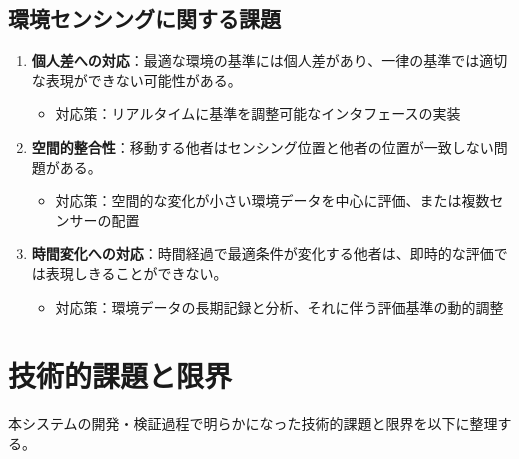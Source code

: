 \documentclass{cuxarticle}
\begin{document}
\subsection{環境センシングに関する課題}
\begin{enumerate}
  \item \textbf{個人差への対応}：最適な環境の基準には個人差があり、一律の基準では適切な表現ができない可能性がある。
    \begin{itemize}
      \item 対応策：リアルタイムに基準を調整可能なインタフェースの実装
    \end{itemize}

  \item \textbf{空間的整合性}：移動する他者はセンシング位置と他者の位置が一致しない問題がある。
    \begin{itemize}
      \item 対応策：空間的な変化が小さい環境データを中心に評価、または複数センサーの配置
    \end{itemize}

  \item \textbf{時間変化への対応}：時間経過で最適条件が変化する他者は、即時的な評価では表現しきることができない。
    \begin{itemize}
      \item 対応策：環境データの長期記録と分析、それに伴う評価基準の動的調整
    \end{itemize}
\end{enumerate}

\section{技術的課題と限界}
本システムの開発・検証過程で明らかになった技術的課題と限界を以下に整理する。
\end{document}
